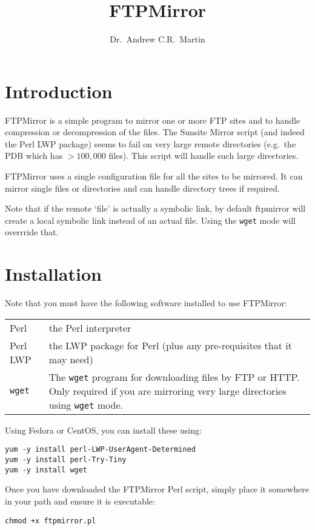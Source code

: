 \documentclass{article}
\title{FTPMirror}
\author{Dr.\ Andrew C.R.\ Martin}
\begin{document}
\maketitle

\section{Introduction}
FTPMirror is a simple program to mirror one or more FTP sites and to
handle compression or decompression of the files. The Sunsite Mirror
script (and indeed the Perl LWP package) seems to fail on very large
remote directories (e.g.\ the PDB which has $>100,000$ files). This script
will handle such large directories.

FTPMirror uses a single configuration file for all the sites to be
mirrored. It can mirror single files or directories and can handle
directory trees if required.

Note that if the remote `file' is actually a symbolic link, by default
ftpmirror will create a local symbolic link instead of an actual
file. Using the \verb|wget| mode will overrride that.

\section{Installation}
Note that you must have the following software installed to use
FTPMirror:

\begin{center}
\begin{tabularx}{\linewidth}{lX}\hline
Perl & the Perl interpreter \\
Perl LWP &  the LWP package for Perl (plus any pre-requisites
that it may need) \\
\verb|wget| &  The \verb|wget| program for downloading files by FTP or
HTTP. Only required if you are mirroring very large directories
using \verb|wget| mode.\\\hline
\end{tabularx}
\end{center}

Using Fedora or CentOS, you can install these using:
\begin{verbatim}
yum -y install perl-LWP-UserAgent-Determined
yum -y install perl-Try-Tiny
yum -y install wget
\end{verbatim}

Once you have downloaded the FTPMirror Perl script, simply place it
somewhere in your path and ensure it is executable:
\begin{verbatim}
chmod +x ftpmirror.pl
\end{verbatim}
\end{document}
